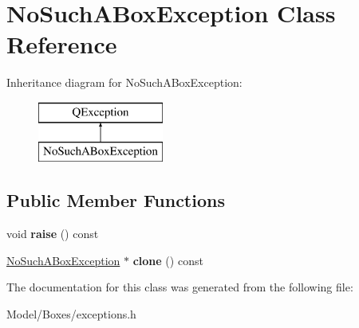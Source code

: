 \hypertarget{class_no_such_a_box_exception}{\section{No\-Such\-A\-Box\-Exception Class Reference}
\label{class_no_such_a_box_exception}
}
Inheritance diagram for No\-Such\-A\-Box\-Exception\-:\begin{figure}[H]
\begin{center}
\leavevmode
\includegraphics[height=2.000000cm]{class_no_such_a_box_exception}
\end{center}
\end{figure}
\subsection*{Public Member Functions}
\begin{DoxyCompactItemize}
\item 
\hypertarget{class_no_such_a_box_exception_a8e7a3bc3b9043ce902447846e4d03197}{void {\bfseries raise} () const }\label{class_no_such_a_box_exception_a8e7a3bc3b9043ce902447846e4d03197}

\item 
\hypertarget{class_no_such_a_box_exception_a2bbaca48346ae41db62615549e999593}{\hyperlink{class_no_such_a_box_exception}{No\-Such\-A\-Box\-Exception} $\ast$ {\bfseries clone} () const }\label{class_no_such_a_box_exception_a2bbaca48346ae41db62615549e999593}

\end{DoxyCompactItemize}


The documentation for this class was generated from the following file\-:\begin{DoxyCompactItemize}
\item 
Model/\-Boxes/exceptions.\-h\end{DoxyCompactItemize}

